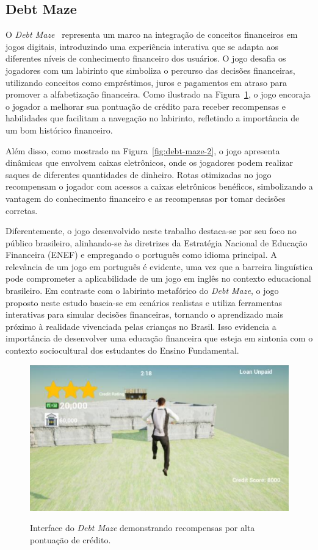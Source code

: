 \subsection{Debt Maze}
\label{subsec:debt-maze}

O \textit{Debt Maze}~\cite{Debt_Maze} representa um marco na integração de conceitos financeiros em jogos digitais, introduzindo uma experiência interativa que se adapta aos diferentes níveis de conhecimento financeiro dos usuários. O jogo desafia os jogadores com um labirinto que simboliza o percurso das decisões financeiras, utilizando conceitos como empréstimos, juros e pagamentos em atraso para promover a alfabetização financeira. Como ilustrado na Figura~\ref{fig:debt-maze-1}, o jogo encoraja o jogador a melhorar sua pontuação de crédito para receber recompensas e habilidades que facilitam a navegação no labirinto, refletindo a importância de um bom histórico financeiro.

Além disso, como mostrado na Figura~\ref{fig:debt-maze-2}, o jogo apresenta dinâmicas que envolvem caixas eletrônicos, onde os jogadores podem realizar saques de diferentes quantidades de dinheiro. Rotas otimizadas no jogo recompensam o jogador com acessos a caixas eletrônicos benéficos, simbolizando a vantagem do conhecimento financeiro e as recompensas por tomar decisões corretas.

Diferentemente, o jogo desenvolvido neste trabalho destaca-se por seu foco no público brasileiro, alinhando-se às diretrizes da Estratégia Nacional de Educação Financeira (ENEF) e empregando o português como idioma principal. A relevância de um jogo em português é evidente, uma vez que a barreira linguística pode comprometer a aplicabilidade de um jogo em inglês no contexto educacional brasileiro. Em contraste com o labirinto metafórico do \textit{Debt Maze}, o jogo proposto neste estudo baseia-se em cenários realistas e utiliza ferramentas interativas para simular decisões financeiras, tornando o aprendizado mais próximo à realidade vivenciada pelas crianças no Brasil. Isso evidencia a importância de desenvolver uma educação financeira que esteja em sintonia com o contexto sociocultural dos estudantes do Ensino Fundamental.

\begin{figure}[ht]
	\centering
	\caption{Interface do \textit{Debt Maze} demonstrando recompensas por alta pontuação de crédito.}
	\includegraphics[scale=0.9]{Textuais/Pictures/debt-maze-1.png}
	\label{fig:debt-maze-1}
\end{figure}


